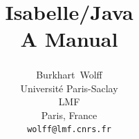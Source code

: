 \documentclass[abstract=on,fontsize=10pt,a4paper,mpinclude=true,
oneside,
pagesize,DIV=14]{scrartcl}
\title{Isabelle/Java\\[.3em]\large A Manual}
\author{
Burkhart~Wolff\textsuperscript{\orcidlink{0000-0002-9648-7663}}\\\small
Universit\'e Paris-Saclay\\
LMF\\
Paris, France\\
\texttt{wolff@lmf.cnrs.fr}
}
\date{}
\begin{document}
\renewcommand{\sectionautorefname}{Section}
\renewcommand{\subsectionautorefname}{Section}
\renewcommand{\subsubsectionautorefname}{Section}

\maketitle



\printbibliography
\end{document}
